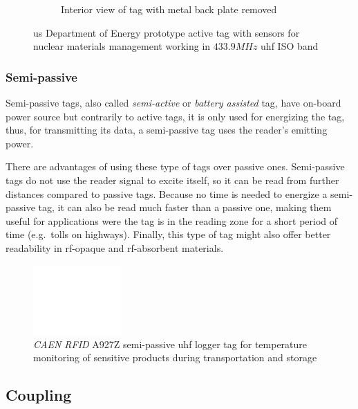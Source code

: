 \begin{figure}[!ht]
\begin{subfigure}{.4\textwidth}
        \caption{Interior view of tag with metal back plate removed}
        \label{fig:activetagsub2}
    \end{subfigure}
    \caption{\ac{us} Department of Energy prototype active tag with sensors for nuclear materials management working in $433.9MHz$ \ac{uhf} ISO band~\cite{tsaiApplyingRFIDTechnology2008}} 
    \label{fig:activetag}
\end{figure}

\subsubsection{Semi-passive}

Semi-passive tags, also called \emph{semi-active} or \emph{battery assisted} tag, have on-board power source but contrarily to active tags, it is only used for energizing the tag, thus, for transmitting its data, a semi-passive tag uses the reader's emitting power.

There are advantages of using these type of tags over passive ones.
Semi-passive tags do not use the reader signal to excite itself, so it can be read from further distances compared to passive tags. Because no time is needed to energize a semi-passive tag, it can also be read much faster than a passive one, making them useful for applications were the tag is in the reading zone for a short period of time (e.g.\ tolls on highways). Finally, this type of tag might also offer better readability in \ac{rf}-opaque and \ac{rf}-absorbent materials.

\begin{figure}[!ht]
    \centering
    \includegraphics[width=0.3\textwidth]{./figs/02-state-of-the-art/semiactive_tag.pdf}
    \caption{\textit{CAEN RFID} A927Z semi-passive \ac{uhf} logger tag for temperature monitoring of sensitive products during transportation and storage~\cite{caenCaenA927ZTemp}} 
    \label{fig:semipassivetag}
\end{figure}

\subsection{Coupling}

